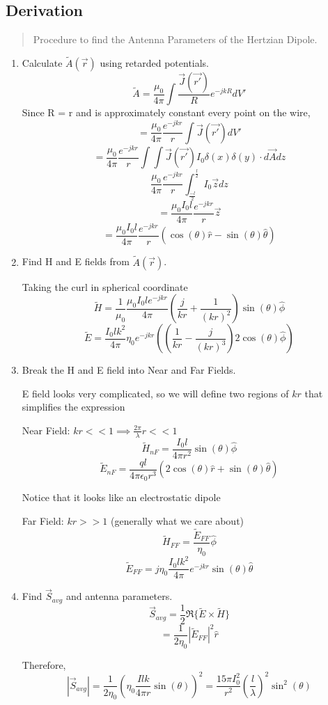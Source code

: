 \documentclass{article} %
\begin{document}
\subsection{Derivation}
\begin{quote}
    Procedure to find the Antenna Parameters of the Hertzian Dipole.
\end{quote}
\begin{enumerate}
    \item Calculate $\tilde{A}(\vec{r})$ using retarded potentials.
          \[\tilde{A} = \frac{\mu_0}{4 \pi}\int \frac{\vec{J}(\vec{r'})}{R}e^{-jkR}dV'\]
          Since R = r and is approximately constant every point on the wire,
          \[= \frac{\mu_0}{4 \pi}\frac{e^{-jkr}}{r} \int \vec{J}(\vec{r'})dV'\]
          \[= \frac{\mu_0}{4 \pi}\frac{e^{-jkr}}{r}\int \int \vec{J}(\vec{r'})  I_0 \delta(x)\delta(y) \cdot d\vec{A} dz\]
          \[\frac{\mu_0}{4 \pi}\frac{e^{-jkr}}{r}\int_{\frac{-l}{2}}^{\frac{l}{2}}I_0 \vec{z} dz\]
          \[= \frac{\mu_0 I_0 l}{4 \pi}\frac{e^{-jkr}}{r}\vec{z}\]
          \[= \frac{\mu_0 I_0 l}{4 \pi}\frac{e^{-jkr}}{r}(\cos(\theta) \hat{r} -\sin(\theta) \hat{\theta})\]
    \item Find H and E fields from $\tilde{A}(\vec{r})$.

          \bigskip
          Taking the curl in spherical coordinate
          \[\tilde{H} = \frac{1}{\mu_0}\frac{\mu_0 I_0 l e^{-jkr}}{4 \pi}\left(\frac{j}{kr} + \frac{1}{(kr)^2}\right)\sin(\theta)\hat{\phi}\]
          \[\tilde{E}= \frac{I_0 l k^2}{4 \pi}\eta_0 e^{-jkr}(\left(\frac{1}{kr} - \frac{j}{(kr)^3}\right)2\cos(\theta)\hat{\phi}) \]
    \item Break the H and E field into Near and Far Fields.

          \bigskip
          E field looks very complicated, so we will define two regions of $kr$ that simplifies the expression

          \bigskip
          Near Field: $kr << 1 \implies \frac{2 \pi}{\lambda} r << 1$
          \[\tilde{H}_{nF} = \frac{I_0 l}{4 \pi r^2}\sin(\theta) \hat{\phi}\]
          \[\tilde{E}_{nF} = \frac{q l}{4 \pi \epsilon_0 r^3}(2 \cos(\theta) \hat{r} + \sin(\theta) \hat{\theta})\]

          Notice that it looks like an electrostatic dipole

          \bigskip
          Far Field: $kr >> 1$ (generally what we care about)
          \[\tilde{H}_{FF} = \frac{\tilde{E}_{FF}}{\eta_0}\hat{\phi}\]
          \[\tilde{E}_{FF} = j\eta_0\frac{I_0 l k^2}{4 \pi} e^{-jkr}\sin(\theta)\hat{\theta}\]

    \item Find $\vec{S}_{avg}$ and antenna parameters.
          \[\vec{S}_{avg} = \frac{1}{2}\Re\{\tilde{E} \times \tilde{H}\}\]
          \[= \frac{1}{2 \eta_0} |\tilde{E}_{FF}|^2 \hat{r}\]


          Therefore,
          \[| \vec{S}_{avg} | = \frac{1}{2 \eta_0} \left(\eta_0 \frac{Ilk}{4 \pi r}\sin(\theta)\right)^2 = \frac{15 \pi I_0 ^2}{r^2}\left(\frac{l}{\lambda}\right)^2 \sin^2(\theta)\]
\end{enumerate}
\end{document}
